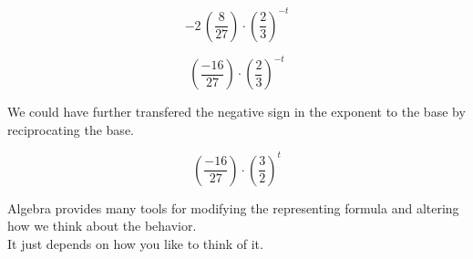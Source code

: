 \documentclass{ximera}
\begin{document}
\[
-2 \, \left( \frac{8}{27} \right)  \cdot \left( \frac{2}{3} \right)^{-t}
\]


\[
\left( \frac{-16}{27} \right)  \cdot \left( \frac{2}{3} \right)^{-t}
\]


We could have further transfered the negative sign in the exponent to the base by reciprocating the base.

\[
\left( \frac{-16}{27} \right)  \cdot \left( \frac{3}{2} \right)^t
\]



Algebra provides many tools for modifying the representing formula and altering how we think about the behavior. \\


It just depends on how you like to think of it. \\
\end{document}
